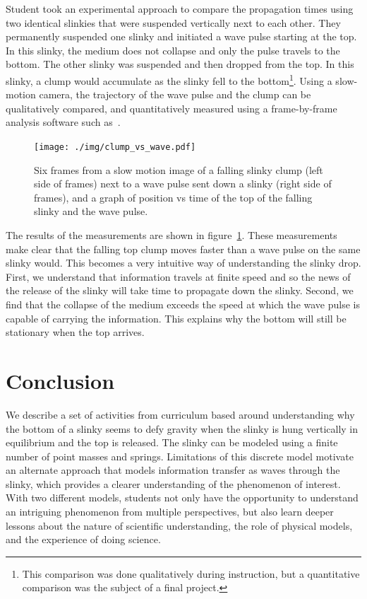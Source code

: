 \documentclass[pre,preprint,superscriptaddress,longbibliography]{revtex4-1}
\newcommand{\fig}[1]{figure~\ref{fig:#1}}
\newcommand{\FIGclumppulse}{
\begin{figure}[t]\center
\texttt{[image: ./img/clump\_vs\_wave.pdf]}
\caption{\label{fig:clumppulse} Six frames from a slow motion image of a falling slinky clump (left side of frames) next to a wave pulse sent down a slinky (right side of frames), and a graph of position vs time of the top of the falling slinky and the wave pulse.}
\end{figure}
}
\begin{document}
Student took an experimental approach to compare the propagation times using two identical slinkies that were suspended vertically next to each other.
They permanently suspended one slinky and initiated a wave pulse starting at the top.
In this slinky, the medium does not collapse and only the pulse travels to the bottom. The other slinky was suspended and then dropped from the top. In this
slinky, a clump would accumulate as the slinky fell to the bottom\footnote{This comparison was done qualitatively during instruction, but a quantitative comparison was the subject of a final project.}. Using a slow-motion camera, the trajectory of the wave pulse
and the clump can be qualitatively compared, and quantitatively measured using a frame-by-frame analysis software such as~\cite{tracker}.

\FIGclumppulse

The results of the measurements are shown in \fig{clumppulse}. 
These measurements make clear that the falling top clump moves faster than a wave pulse on the same slinky would. 
This becomes a very intuitive way of understanding the slinky drop. 
First, we understand that information travels at finite speed and so the news of the release of the slinky will take time to propagate down the slinky.
Second, we find that the collapse of the medium exceeds the speed at which  the wave pulse is capable of carrying the information. This explains why the bottom will still be stationary when the top arrives.

\section{Conclusion}
We describe a set of activities from curriculum based around understanding why the bottom of a slinky seems to defy gravity when the slinky is hung vertically in equilibrium and the top is released.  The slinky can be modeled using a finite number of point masses and springs. Limitations of this discrete model motivate an alternate approach that models information transfer as waves through the slinky, which provides a clearer understanding of the phenomenon of interest.  With two different models, students not only have the opportunity to understand an intriguing phenomenon from multiple perspectives, but also learn deeper lessons about the nature of scientific understanding, the role of physical models, and the experience of doing science.


\end{document}
